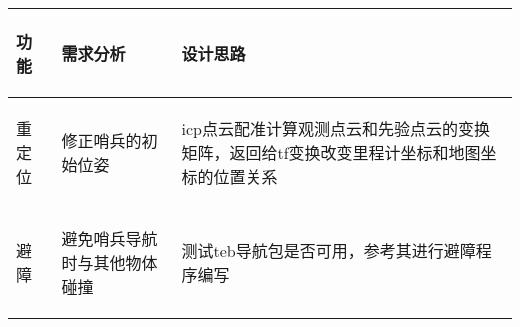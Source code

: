 
\begin{longtable}{ p{2cm} | p{7.8cm} | p{6cm} |}

    \hline

    \endfoot
    
    \rowcolor{tabhdcolor}

        \begin{center}
            功能
        \end{center} &
        \begin{center}
            需求分析
        \end{center} &
        \begin{center}
            设计思路
        \end{center} \\

    \hline

    \endhead

        \begin{center}
            重定位
        \end{center} &
        \begin{center}
            修正哨兵的初始位姿
        \end{center} &
        \begin{center}
            icp点云配准计算观测点云和先验点云的变换矩阵，返回给tf变换改变里程计坐标和地图坐标的位置关系
        \end{center} \\
        
    \hline

        \begin{center}
            避障
        \end{center} &
        \begin{center}
            避免哨兵导航时与其他物体碰撞
        \end{center} &
        \begin{center}
            测试teb导航包是否可用，参考其进行避障程序编写
        \end{center} \\
        

\end{longtable}
